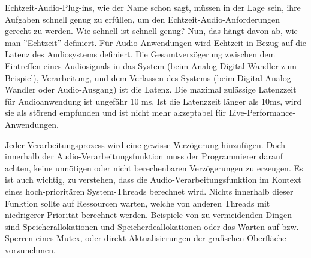Echtzeit-Audio-Plug-ins, wie der Name schon sagt, müssen in der Lage sein, ihre Aufgaben schnell genug zu erfüllen, um den Echtzeit-Audio-Anforderungen gerecht zu werden. Wie schnell ist schnell genug? Nun, das hängt davon ab, wie man ”Echtzeit” definiert. Für Audio-Anwendungen wird Echtzeit in Bezug auf die Latenz des Audiosystems definiert. Die Gesamtverzögerung zwischen dem Eintreffen eines Audiosignals in das System (beim Analog-Digital-Wandler zum Beispiel), Verarbeitung, und dem Verlassen des Systems (beim Digital-Analog-Wandler oder Audio-Ausgang) ist die Latenz. Die maximal zulässige Latenzzeit für Audioanwendung ist ungefähr 10 ms. Ist die Latenzzeit länger als 10ms, wird sie  als störend empfunden und ist nicht mehr akzeptabel für Live-Performance-Anwendungen.

Jeder Verarbeitungsprozess wird eine gewisse Verzögerung hinzufügen. Doch innerhalb der Audio-Verarbeitungsfunktion muss der Programmierer darauf achten, keine unnötigen oder nicht berechenbaren Verzögerungen zu erzeugen. Es ist auch wichtig, zu verstehen, dass die Audio-Verarbeitungsfunktion im Kontext eines hoch-prioritären System-Threads berechnet wird. Nichts innerhalb dieser Funktion sollte auf Ressourcen warten, welche von anderen Threads mit niedrigerer Priorität berechnet werden. Beispiele von zu vermeidenden Dingen sind Speicherallokationen und Speicherdeallokationen oder das Warten auf bzw. Sperren eines Mutex, oder direkt Aktualisierungen der grafischen Oberfläche vorzunehmen.